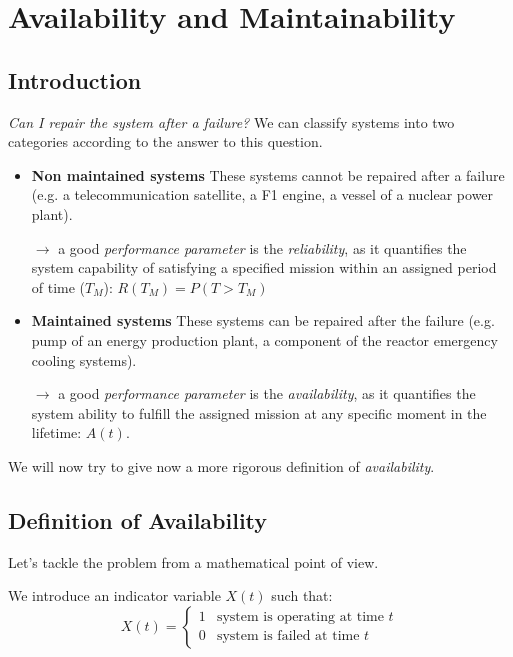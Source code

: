 
\chapter{Availability and Maintainability}
\section{Introduction}
\emph{Can I repair the system after a failure?} We can classify systems into two
categories according to the answer to this question.
\begin{itemize}
    \item \textbf{Non maintained systems} These systems cannot be repaired after a
    failure (e.g. a  telecommunication satellite, a F1 engine, a vessel of a nuclear
    power plant).
    
    $\to$ a good \emph{performance parameter} is the \emph{reliability}, as it
    quantifies the system capability of satisfying a specified mission within an
    assigned period of time ($T_M$): $R(T_M) = P(T>T_M)$

    \item \textbf{Maintained systems} These systems can be repaired after the failure
    (e.g. pump of an energy production plant, a component of the reactor emergency
    cooling systems).
    
    $\to$ a good \emph{performance parameter} is the \emph{availability}, as it
    quantifies the system ability to fulfill the assigned mission at any specific
    moment in the lifetime: $A(t)$.
\end{itemize}

We will now try to give now a more rigorous definition of \emph{availability}.

\section{Definition of Availability}
Let's tackle the problem from a mathematical point of view.

We introduce an indicator variable $X(t)$ such that:
\begin{equation*}
    X(t)=\begin{cases}
        1 & \text{system is operating at time } t \\
        0 & \text{system is failed at time } t
    \end{cases}
\end{equation*}


